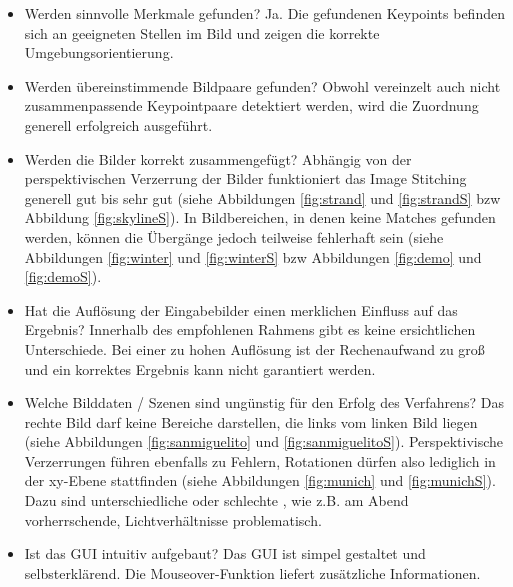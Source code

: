 \documentclass[deutsch]{scrartcl}
\begin{document}
\begin{itemize}
	\item Werden sinnvolle Merkmale gefunden? 
		Ja. Die gefundenen Keypoints befinden sich an geeigneten Stellen im Bild und zeigen die korrekte Umgebungsorientierung.
	\item Werden übereinstimmende Bildpaare gefunden? 
		Obwohl vereinzelt auch nicht zusammenpassende Keypointpaare detektiert werden, wird die Zuordnung generell erfolgreich ausgeführt.
	\item Werden die Bilder korrekt zusammengefügt? 
		Abhängig von der perspektivischen Verzerrung der Bilder funktioniert das Image Stitching generell gut bis sehr gut (siehe Abbildungen \ref{fig:strand} und \ref{fig:strandS} bzw Abbildung \ref{fig:skylineS}). In Bildbereichen, in denen keine Matches gefunden werden, können die Übergänge jedoch teilweise fehlerhaft sein (siehe Abbildungen \ref{fig:winter} und \ref{fig:winterS} bzw Abbildungen \ref{fig:demo} und \ref{fig:demoS}).
	\item Hat die Auflösung der Eingabebilder einen merklichen Einﬂuss auf das Ergebnis? 
		Innerhalb des empfohlenen Rahmens gibt es keine ersichtlichen Unterschiede. Bei einer zu hohen Auflösung ist der Rechenaufwand zu groß und ein korrektes Ergebnis kann nicht garantiert werden. 
	\item Welche Bilddaten / Szenen sind ungünstig für den Erfolg des Verfahrens? 
		Das rechte Bild darf keine Bereiche darstellen, die links vom linken Bild liegen (siehe Abbildungen \ref{fig:sanmiguelito} und \ref{fig:sanmiguelitoS}). Perspektivische Verzerrungen führen ebenfalls zu Fehlern, Rotationen dürfen also lediglich in der xy-Ebene stattfinden (siehe Abbildungen \ref{fig:munich} und \ref{fig:munichS}). Dazu sind unterschiedliche oder schlechte , wie z.B. am Abend vorherrschende, Lichtverhältnisse problematisch.
	\item Ist das GUI intuitiv aufgebaut?
		Das GUI ist simpel gestaltet und selbsterklärend. Die Mouseover-Funktion liefert zusätzliche Informationen.
\end{itemize}

\newpage
\end{document}
